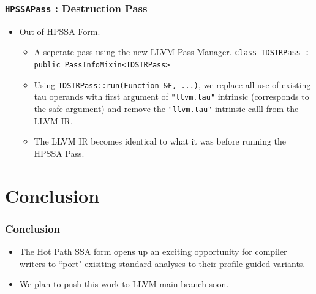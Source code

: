 \documentclass[aspectratio=169, compress]{beamer}
\begin{document}
\begin{frame}
	\frametitle{\texttt{HPSSAPass} : Destruction Pass}
	\begin{itemize}
		\item Out of HPSSA Form. 
		\begin{itemize}
			\item A seperate pass using the new LLVM Pass Manager. \texttt{class TDSTRPass : public PassInfoMixin<TDSTRPass>} \pause
			\item Using \texttt{TDSTRPass::run(Function &F, ...)}, we replace all use of existing tau operands with first argument of  \texttt{"llvm.tau"} intrinsic (corresponds to the safe argument) and remove the \texttt{"llvm.tau"} intrinsic calll from the LLVM IR.
			\item The LLVM IR becomes identical to what it was before running the HPSSA Pass. 
		\end{itemize}
	\end{itemize}
\end{frame}

\footnotesize

\section{Conclusion}
\begin{frame}
	\frametitle{Conclusion}
	\begin{itemize}
		\item The Hot Path SSA form opens up an exciting opportunity for compiler writers to ``port" exisiting standard analyses to their profile guided variants. \pause
		\item We plan to push this work to LLVM main branch soon. 
	\end{itemize}
\end{frame}
\footnotesize
\end{document}
